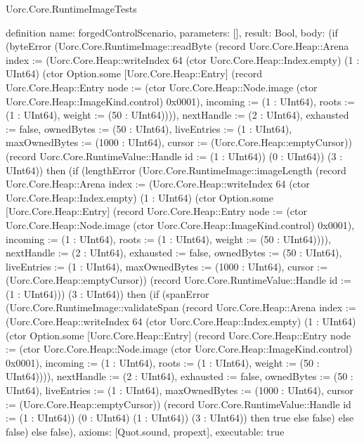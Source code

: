 \begin{lexlean}{Uorc.Core.RuntimeImageTests}
\begin{semanticmodule}
definition{
  name: forgedControlScenario,
  parameters: [],
  result: Bool,
  body: (if (byteError (Uorc.Core.RuntimeImage::readByte (record Uorc.Core.Heap::Arena {index := (Uorc.Core.Heap::writeIndex 64 (ctor Uorc.Core.Heap::Index.empty) (1 : UInt64) (ctor Option.some [Uorc.Core.Heap::Entry] (record Uorc.Core.Heap::Entry {node := (ctor Uorc.Core.Heap::Node.image (ctor Uorc.Core.Heap::ImageKind.control) 0x0001), incoming := (1 : UInt64), roots := (1 : UInt64), weight := (50 : UInt64)}))), nextHandle := (2 : UInt64), exhausted := false, ownedBytes := (50 : UInt64), liveEntries := (1 : UInt64), maxOwnedBytes := (1000 : UInt64), cursor := (Uorc.Core.Heap::emptyCursor)}) (record Uorc.Core.RuntimeValue::Handle {id := (1 : UInt64)}) (0 : UInt64)) (3 : UInt64)) then (if (lengthError (Uorc.Core.RuntimeImage::imageLength (record Uorc.Core.Heap::Arena {index := (Uorc.Core.Heap::writeIndex 64 (ctor Uorc.Core.Heap::Index.empty) (1 : UInt64) (ctor Option.some [Uorc.Core.Heap::Entry] (record Uorc.Core.Heap::Entry {node := (ctor Uorc.Core.Heap::Node.image (ctor Uorc.Core.Heap::ImageKind.control) 0x0001), incoming := (1 : UInt64), roots := (1 : UInt64), weight := (50 : UInt64)}))), nextHandle := (2 : UInt64), exhausted := false, ownedBytes := (50 : UInt64), liveEntries := (1 : UInt64), maxOwnedBytes := (1000 : UInt64), cursor := (Uorc.Core.Heap::emptyCursor)}) (record Uorc.Core.RuntimeValue::Handle {id := (1 : UInt64)})) (3 : UInt64)) then (if (spanError (Uorc.Core.RuntimeImage::validateSpan (record Uorc.Core.Heap::Arena {index := (Uorc.Core.Heap::writeIndex 64 (ctor Uorc.Core.Heap::Index.empty) (1 : UInt64) (ctor Option.some [Uorc.Core.Heap::Entry] (record Uorc.Core.Heap::Entry {node := (ctor Uorc.Core.Heap::Node.image (ctor Uorc.Core.Heap::ImageKind.control) 0x0001), incoming := (1 : UInt64), roots := (1 : UInt64), weight := (50 : UInt64)}))), nextHandle := (2 : UInt64), exhausted := false, ownedBytes := (50 : UInt64), liveEntries := (1 : UInt64), maxOwnedBytes := (1000 : UInt64), cursor := (Uorc.Core.Heap::emptyCursor)}) (record Uorc.Core.RuntimeValue::Handle {id := (1 : UInt64)}) (0 : UInt64) (1 : UInt64)) (3 : UInt64)) then true else false) else false) else false),
  axioms: [Quot.sound, propext],
  executable: true
}


\end{semanticmodule}
\end{lexlean}
